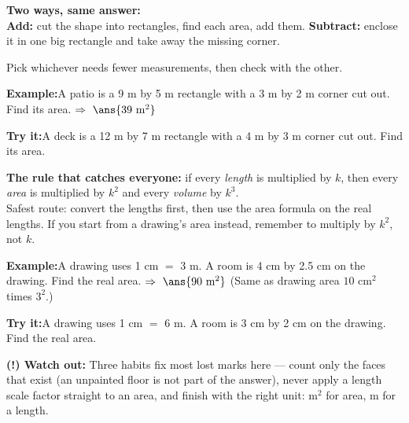 \documentclass[12pt]{article}
\begin{document}
\begin{formulabox}\textbf{Two ways, same answer:}\\[3pt]
\textbf{Add:} cut the shape into rectangles, find each area, add them.\quad
\textbf{Subtract:} enclose it in one big rectangle and take away the missing corner.\par
Pick whichever needs fewer measurements, then check with the other.
\end{formulabox}
\begin{examplebox}\textbf{Example:}\quad A patio is a 9 m by 5 m rectangle with a 3 m by 2 m corner cut out. Find its area.
$\Rightarrow\ \ans{39 \text{ m}^2}$
\end{examplebox}
\begin{tryitbox}\textbf{Try it:}\quad A deck is a 12 m by 7 m rectangle with a 4 m by 3 m corner cut out. Find its area.\\[2pt]
\end{tryitbox}

\begin{formulabox}\textbf{The rule that catches everyone:} if every \emph{length} is multiplied
by $k$, then every \emph{area} is multiplied by $k^2$ and every \emph{volume} by $k^3$.\\[3pt]
Safest route: convert the lengths first, then use the area formula on the real lengths. If you
start from a drawing's area instead, remember to multiply by $k^2$, not $k$.
\end{formulabox}
\begin{examplebox}\textbf{Example:}\quad A drawing uses 1 cm $=$ 3 m. A room is 4 cm by 2.5 cm on the drawing. Find the real area.
$\Rightarrow\ \ans{90 \text{ m}^2}$ \quad (Same as drawing area $10$ cm$^2$ times $3^2$.)
\end{examplebox}
\begin{tryitbox}\textbf{Try it:}\quad A drawing uses 1 cm $=$ 6 m. A room is 3 cm by 2 cm on the drawing. Find the real area.\\[2pt]
\end{tryitbox}

\begin{watchoutbox}\textbf{(!) Watch out:} Three habits fix most lost marks here ---
count only the faces that exist (an unpainted floor is not part of the answer), never apply a
length scale factor straight to an area, and finish with the right unit: m$^2$ for area,
m for a length.
\end{watchoutbox}
\end{document}
